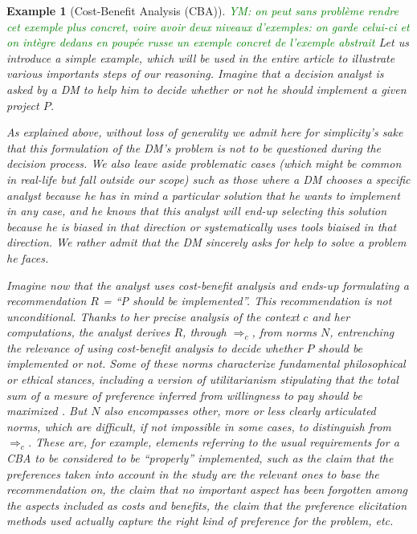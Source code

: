\documentclass[preprint, french, english, 11pt, authoryear]{elsarticle}%
\newtheorem{example}{Example}
\newcommand{\commentYM}[1]{\textcolor{green}{YM: #1}}
\begin{document}
\begin{example}[Cost-Benefit Analysis (CBA)] \commentYM{on peut sans problème rendre cet exemple plus concret, voire avoir deux niveaux d'exemples: on garde celui-ci et on intègre dedans en poupée russe un exemple concret de l'exemple abstrait}
Let us introduce a simple example, which will be used in the entire article to illustrate various importants steps of our reasoning. Imagine that a decision analyst is asked by a \ac{DM} to help him to decide whether or not he should implement a given project $P$.

As explained above, without loss of generality we admit here for simplicity's sake that this formulation of the \ac{DM}'s problem is not to be questioned during the decision process. We also leave aside problematic cases (which might be common in real-life but fall outside our scope) such as those where a \ac{DM} chooses a specific analyst because he has in mind a particular solution that he wants to implement in any case, and he knows that this analyst will end-up selecting this solution because he is biased in that direction or systematically uses tools biaised in that direction. We rather admit that the \ac{DM} sincerely asks for help to solve a problem he faces.

Imagine now that the analyst uses cost-benefit analysis \citep{layard_cost-benefit_1994} and ends-up formulating a recommendation $R$ = “P should be implemented”. This recommendation is not unconditional. Thanks to her precise analysis of the context $c$ and her computations, the analyst derives $R$, through $⇒_c $, from norms $N$, entrenching the relevance of using cost-benefit analysis to decide whether $P$ should be implemented or not. Some of these norms characterize fundamental philosophical or ethical stances, including a version of utilitarianism stipulating that the total sum of a mesure of preference inferred from willingness to pay should be maximized  \citep{meinard_ethical_2016}. 
But $N$ also encompasses other, more or less clearly articulated norms, which are difficult, if not impossible in some cases, to distinguish from $⇒_c $. These are, for example, elements referring to the usual requirements for a CBA to be considered to be ``properly'' implemented, such as the claim that the preferences taken into account in the study are the relevant ones to base the recommendation on, the claim that no important aspect has been forgotten among the aspects included as costs and benefits, the claim that the preference elicitation methods used actually capture the right kind of preference for the problem, etc.
\end{example}
\end{document}
